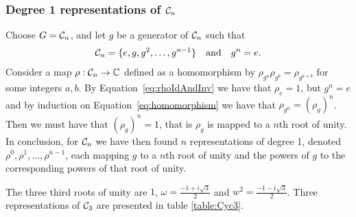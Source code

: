 \subsubsection{Degree 1 representations of $\mathcal{C}_n$}\label{sect:deg1cycn}

Choose $G = \mathcal{C}_n$, and let $g$ be a generator of $\mathcal{C}_n$ such that 
\begin{align*}
	\mathcal{C}_n = \{ e, g, g^2, \dots, g^{n-1}\} \quad \text{and} \quad g^n = e.
\end{align*}
Consider a map $\rho: \mathcal{C}_n \rightarrow \mathbb{C}$ defined as a homomorphism by $\rho_{g^a}\rho_{g^b} = \rho_{g^{a+b}}$ for some integers $a,b$. By Equation~\ref{eq:rhoIdAndInv} we have that $\rho_e = 1$, but $g^n = e$ and by induction on Equation~\ref{eq:homomorphism} we have that $\rho_{g^n} = (\rho_g)^n$. Then we must have that $(\rho_g)^n = 1$, that is $\rho_g$ is mapped to a $n$th root of unity.
In conclusion, for $\mathcal{C}_n$ we have then found $n$ representations of degree 1, denoted $\rho^0, \rho^1, \dots, \rho^{n-1}$, each mapping $g$ to a $n$th root of unity and the powers of $g$ to the corresponding powers of that root of unity. 

\begin{example}[$\Cyc_3$]
	The three third roots of unity are $1$, $\omega = \frac{-1+i\sqrt{3}}{2}$ and $w^2 = \frac{-1-i\sqrt{3}}{2}$. Three representations of $\Cyc_3$ are presented in table \ref{table:Cyc3}. %
	
\end{example}

